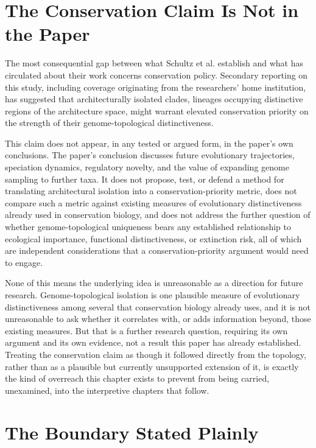 \documentclass[11pt]{book}
\begin{document}
\section{The Conservation Claim Is Not in the Paper}

The most consequential gap between what Schultz et al. establish and what has circulated about their work concerns conservation policy. Secondary reporting on this study, including coverage originating from the researchers' home institution, has suggested that architecturally isolated clades, lineages occupying distinctive regions of the architecture space, might warrant elevated conservation priority on the strength of their genome-topological distinctiveness.

This claim does not appear, in any tested or argued form, in the paper's own conclusions. The paper's conclusion discusses future evolutionary trajectories, speciation dynamics, regulatory novelty, and the value of expanding genome sampling to further taxa. It does not propose, test, or defend a method for translating architectural isolation into a conservation-priority metric, does not compare such a metric against existing measures of evolutionary distinctiveness already used in conservation biology, and does not address the further question of whether genome-topological uniqueness bears any established relationship to ecological importance, functional distinctiveness, or extinction risk, all of which are independent considerations that a conservation-priority argument would need to engage.

None of this means the underlying idea is unreasonable as a direction for future research. Genome-topological isolation is one plausible measure of evolutionary distinctiveness among several that conservation biology already uses, and it is not unreasonable to ask whether it correlates with, or adds information beyond, those existing measures. But that is a further research question, requiring its own argument and its own evidence, not a result this paper has already established. Treating the conservation claim as though it followed directly from the topology, rather than as a plausible but currently unsupported extension of it, is exactly the kind of overreach this chapter exists to prevent from being carried, unexamined, into the interpretive chapters that follow.

\section{The Boundary Stated Plainly}
\end{document}
